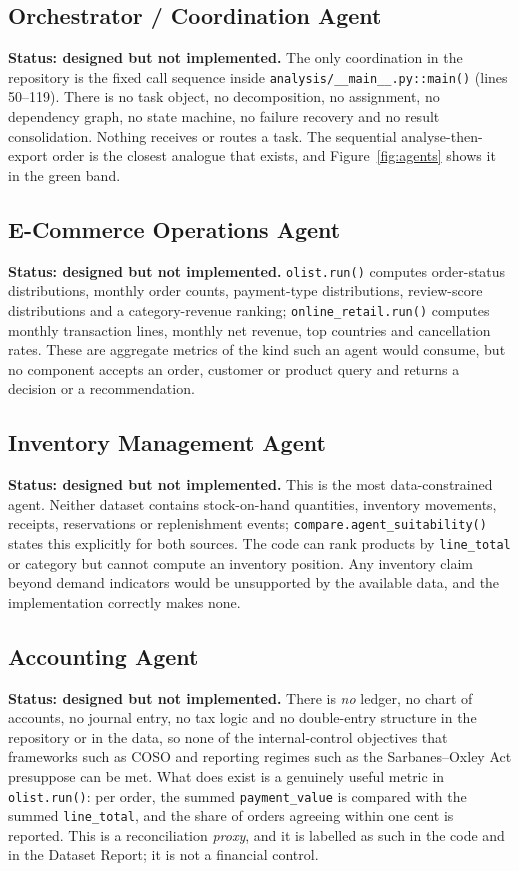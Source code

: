 \documentclass[11pt,a4paper]{article}
\newcommand{\code}[1]{\texttt{#1}}
\begin{document}
\subsection{Orchestrator / Coordination Agent}
\textbf{Status: designed but not implemented.} The only coordination in the repository is the fixed call sequence inside \code{analysis/\_\_main\_\_.py::main()} (lines 50--119). There is no task object, no decomposition, no assignment, no dependency graph, no state machine, no failure recovery and no result consolidation. Nothing receives or routes a task. The sequential analyse-then-export order is the closest analogue that exists, and Figure~\ref{fig:agents} shows it in the green band.

\subsection{E-Commerce Operations Agent}
\textbf{Status: designed but not implemented.} \code{olist.run()} computes order-status distributions, monthly order counts, payment-type distributions, review-score distributions and a category-revenue ranking; \code{online\_retail.run()} computes monthly transaction lines, monthly net revenue, top countries and cancellation rates. These are aggregate metrics of the kind such an agent would consume, but no component accepts an order, customer or product query and returns a decision or a recommendation.

\subsection{Inventory Management Agent}
\textbf{Status: designed but not implemented.} This is the most data-constrained agent. Neither dataset contains stock-on-hand quantities, inventory movements, receipts, reservations or replenishment events; \code{compare.agent\_suitability()} states this explicitly for both sources. The code can rank products by \code{line\_total} or category but cannot compute an inventory position. Any inventory claim beyond demand indicators would be unsupported by the available data, and the implementation correctly makes none.

\subsection{Accounting Agent}
\textbf{Status: designed but not implemented.} There is \emph{no} ledger, no chart of accounts, no journal entry, no tax logic and no double-entry structure in the repository or in the data, so none of the internal-control objectives that frameworks such as COSO \cite{coso2013} and reporting regimes such as the Sarbanes--Oxley Act \cite{sox2002} presuppose can be met. What does exist is a genuinely useful metric in \code{olist.run()}: per order, the summed \code{payment\_value} is compared with the summed \code{line\_total}, and the share of orders agreeing within one cent is reported. This is a reconciliation \emph{proxy}, and it is labelled as such in the code and in the Dataset Report; it is not a financial control.
\end{document}
